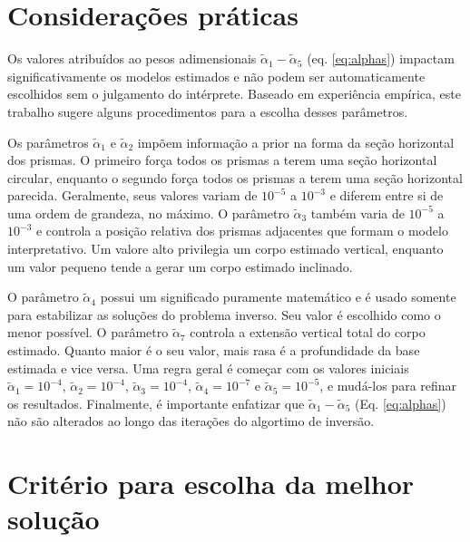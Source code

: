 \section{Considerações práticas}

Os valores atribuídos ao pesos adimensionais $\tilde{\alpha}_{1} - \tilde{\alpha}_{5}$ (eq. \ref{eq:alphas}) impactam significativamente os modelos estimados e não podem ser automaticamente escolhidos sem o julgamento do intérprete.
Baseado em experiência empírica, este trabalho sugere alguns procedimentos para a escolha desses parâmetros.

Os parâmetros $\tilde{\alpha}_1$ e $\tilde{\alpha}_2$ impõem informação a prior na forma da seção horizontal dos prismas.
O primeiro força todos os prismas a terem uma seção horizontal circular, enquanto o segundo força todos os prismas a terem uma seção horizontal parecida.
Geralmente, seus valores variam de $10^{-5}$ a $10^{-3}$ e diferem entre si de uma ordem de grandeza, no máximo.
O parâmetro $\tilde{\alpha}_3$ também varia de $10^{-5}$ a $10^{-3}$ e controla a posição relativa dos prismas adjacentes que formam o modelo interpretativo.
Um valore alto privilegia um corpo estimado vertical, enquanto um valor pequeno tende a gerar um corpo estimado inclinado.

O parâmetro $\tilde{\alpha}_4$ possui um significado puramente matemático e é usado somente para estabilizar as soluções do problema inverso.
Seu valor é escolhido como o menor possível.
O parâmetro $\tilde{\alpha}_7$ controla a extensão vertical total do corpo estimado.
Quanto maior é o seu valor, mais rasa é a profundidade da base estimada e vice versa.
Uma regra geral é começar com os valores iniciais $\tilde{\alpha}_1 = 10^{-4}$, $\tilde{\alpha}_2 = 10^{-4}$, $\tilde{\alpha}_3 = 10^{-4}$, $\tilde{\alpha}_4 = 10^{-7}$ e $\tilde{\alpha}_5 = 10^{-5}$, e mudá-los para refinar os resultados.
Finalmente, é importante enfatizar que  $\tilde{\alpha}_1 - \tilde{\alpha}_5$ (Eq. \ref{eq:alphas}) não são alterados ao longo das iterações do algortimo de inversão.

\section{Critério para escolha da melhor solução}
\label{sec:criterio}

